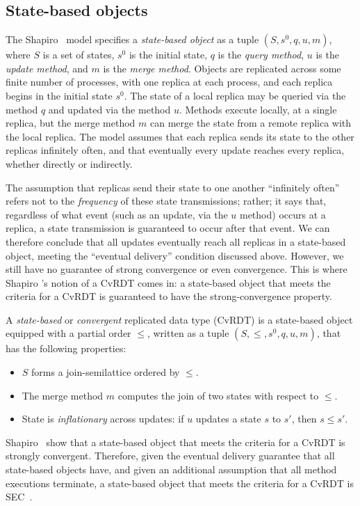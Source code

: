 \subsection{State-based objects}

The Shapiro \etal~model specifies a \emph{state-based object} as a
tuple $(S, s^0, q, u, m)$, where $S$ is a set of states, $s^0$ is the
initial state, $q$ is the \emph{query method}, $u$ is the \emph{update
  method}, and $m$ is the \emph{merge method}.  Objects are replicated
across some finite number of processes, with one replica at each
process, and each replica begins in the initial state $s^0$.  The
state of a local replica may be queried via the method $q$ and updated
via the method $u$.  Methods execute locally, at a single replica, but
the merge method $m$ can merge the state from a remote replica with
the local replica.  The model assumes that each replica sends its
state to the other replicas infinitely often, and that eventually
every update reaches every replica, whether directly or indirectly.

The assumption that replicas send their state to one another
``infinitely often'' refers not to the \emph{frequency} of these state
transmissions; rather; it says that, regardless of what event (such as
an update, via the $u$ method) occurs at a replica, a state
transmission is guaranteed to occur after that event.  We can
therefore conclude that all updates eventually reach all replicas in a
state-based object, meeting the ``eventual delivery'' condition
discussed above.  However, we still have no guarantee of strong
convergence or even convergence.  This is where Shapiro \etal's notion
of a CvRDT comes in: a state-based object that meets the criteria for
a CvRDT is guaranteed to have the strong-convergence property.

A \emph{state-based} or \emph{convergent} replicated data type (CvRDT)
is a state-based object equipped with a partial order $\leq$, written
as a tuple
$(S, \leq, s^0, q, u, m)$, that has the following properties:
\begin{itemize}
\item $S$ forms a join-semilattice ordered by $\leq$.
\item The merge method $m$ computes the join of two
  states with respect to $\leq$.
\item State is \emph{inflationary} across updates: if $u$ updates a
  state $s$ to $s'$, then $s \leq s'$.
\end{itemize}
Shapiro \etal~show that a state-based object that meets the criteria
for a CvRDT is strongly convergent.  Therefore, given the eventual
delivery guarantee that all state-based objects have, and given an
additional assumption that all method executions terminate, a
state-based object that meets the criteria for a CvRDT is
SEC~\cite{crdts}.

